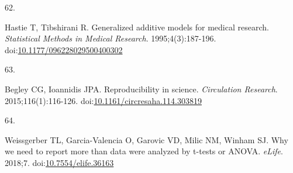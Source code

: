 \documentclass[
]{article}
\newlength{\cslhangindent}
\newlength{\csllabelwidth}
\newlength{\cslentryspacingunit} %
\newenvironment{CSLReferences}[2] %
 {%
  \setlength{\parindent}{0pt}
  \ifodd #1
  \let\oldpar\par
  \def\par{\hangindent=\cslhangindent\oldpar}
  \fi
  \setlength{\parskip}{#2\cslentryspacingunit}
 }%
 {}
\newcommand{\CSLLeftMargin}[1]{\parbox[t]{\csllabelwidth}{#1}}
\newcommand{\CSLRightInline}[1]{\parbox[t]{\linewidth - \csllabelwidth}{#1}\break}
\begin{document}
\begin{CSLReferences}{0}{0}
\leavevmode{}%
\CSLLeftMargin{62. }
\CSLRightInline{Hastie T, Tibshirani R. Generalized additive models for medical research. \emph{Statistical Methods in Medical Research}. 1995;4(3):187-196. doi:\href{https://doi.org/10.1177/096228029500400302}{10.1177/096228029500400302}}

\leavevmode{}%
\CSLLeftMargin{63. }
\CSLRightInline{Begley CG, Ioannidis JPA. Reproducibility in science. \emph{Circulation Research}. 2015;116(1):116-126. doi:\href{https://doi.org/10.1161/circresaha.114.303819}{10.1161/circresaha.114.303819}}

\leavevmode{}%
\CSLLeftMargin{64. }
\CSLRightInline{Weissgerber TL, Garcia-Valencia O, Garovic VD, Milic NM, Winham SJ. Why we need to report more than {\textquotesingle}data were analyzed by t-tests or {ANOVA}{\textquotesingle}. \emph{{eLife}}. 2018;7. doi:\href{https://doi.org/10.7554/elife.36163}{10.7554/elife.36163}}

\end{CSLReferences}
\end{document}
